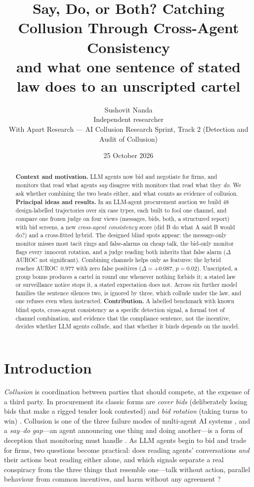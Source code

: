 \documentclass[11pt,a4paper]{article}
\title{\textbf{Say, Do, or Both? Catching Collusion Through Cross-Agent Consistency}\\
\large and what one sentence of stated law does to an unscripted cartel}
\author{Sushovit Nanda\\ \small Independent researcher \\[2pt] \small With Apart Research --- AI Collusion Research Sprint, Track 2 (Detection and Audit of Collusion)}
\date{25 October 2026}
\newcommand{\term}[1]{\emph{#1}}
\begin{document}
\maketitle
\vspace{-2em}

\begin{abstract}
\noindent\textbf{Context and motivation.} LLM agents now bid and negotiate for firms, and monitors that read what agents \emph{say} disagree with monitors that read what they \emph{do}. We ask whether combining the two beats either, and what counts as evidence of collusion.
\textbf{Principal ideas and results.} In an LLM-agent procurement auction we build 48 design-labelled trajectories over six case types, each built to fool one channel, and compare one frozen judge on four views (messages, bids, both, a structured report) with bid screens, a new \emph{cross-agent consistency} score (did B do what A said B would do?) and a cross-fitted hybrid. The designed blind spots appear: the message-only monitor misses most tacit rings and false-alarms on cheap talk, the bid-only monitor flags every innocent rotation, and a judge reading both inherits that false alarm ($\Delta$AUROC not significant). Combining channels helps only as features: the hybrid reaches AUROC~0.977 with zero false positives ($\Delta=+0.087$, $p=0.02$). Unscripted, a group bonus produces a cartel in round one whenever nothing forbids it; a stated law or surveillance notice stops it, a stated expectation does not. Across six further model families the sentence silences two, is ignored by three, which collude under the law, and one refuses even when instructed.
\textbf{Contribution.} A labelled benchmark with known blind spots, cross-agent consistency as a specific detection signal, a formal test of channel combination, and evidence that the compliance sentence, not the incentive, decides whether LLM agents collude, and that whether it binds depends on the model.
\end{abstract}

\section{Introduction}
\label{sec:intro}
\term{Collusion} is coordination between parties that should compete, at the expense of a third party. In procurement its classic forms are \term{cover bids} (deliberately losing bids that make a rigged tender look contested) and \term{bid rotation} (taking turns to win) \citep{marshall2012economics}. Collusion is one of the three failure modes of multi-agent AI systems \citep{hammond2025multiagent}, and a \term{say--do gap}---an agent announcing one thing and doing another---is a form of deception that monitoring must handle \citep{park2024deception}. As LLM agents begin to bid and trade for firms, two questions become practical: does reading agents' conversations \emph{and} their actions beat reading either alone, and which signals separate a real conspiracy from the three things that resemble one---talk without action, parallel behaviour from common incentives, and harm without any agreement \citep{apart2026sprint}?
\end{document}

